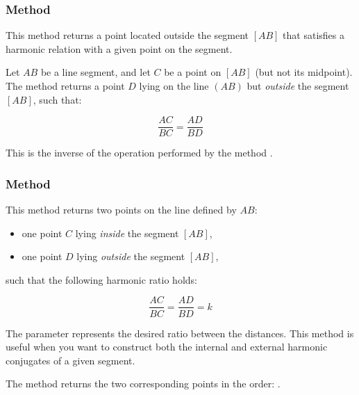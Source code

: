 
\subsubsection{Method } %
\label{ssub:method_imeth_line_harmonic__ext_pt}
This method returns a point located outside the segment $[AB]$ that satisfies a harmonic relation with a given point on the segment.

\medskip
\noindent
Let $AB$ be a line segment, and let $C$ be a point on $[AB]$ (but not its midpoint). The method returns a point $D$ lying on the line $(AB)$ but \emph{outside} the segment $[AB]$, such that:

\[
\frac{AC}{BC} = \frac{AD}{BD}
\]

\noindent
This is the inverse of the operation performed by the method .


\subsubsection{Method } %
\label{ssub:harmonic_both}

This method returns two points on the line defined by $AB$:

\begin{itemize}
  \item one point $C$ lying \emph{inside} the segment $[AB]$,
  \item one point $D$ lying \emph{outside} the segment $[AB]$,
\end{itemize}

\noindent such that the following harmonic ratio holds:

\[
\frac{AC}{BC} = \frac{AD}{BD} = k
\]

\noindent
The parameter  represents the desired ratio between the distances. This method is useful when you want to construct both the internal and external harmonic conjugates of a given segment.

\medskip
\noindent
The method returns the two corresponding points in the order: .

\vspace{2em}
\begin{tkzexample}
\begin{center}
\end{center}

\end{tkzexample}

